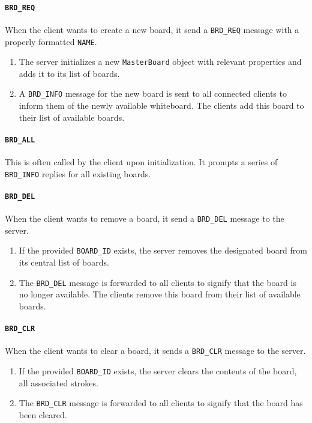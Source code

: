 \paragraph{\texttt{BRD\_REQ}} When the client wants to create a new board, it send a \texttt{BRD\_REQ} message with a properly formatted \texttt{NAME}.
\begin{enumerate}
\item The server initializes a new \texttt{MasterBoard} object with relevant properties and adds it to its list of boards.
\item A \texttt{BRD\_INFO} message for the new board is sent to all connected clients to inform them of the newly available whiteboard. The clients add this board to their list of available boards.
\end{enumerate}

\paragraph{\texttt{BRD\_ALL}} This is often called by the client upon initialization. It prompts a series of \texttt{BRD\_INFO} replies for all existing boards.

\paragraph{\texttt{BRD\_DEL}} When the client wants to remove a board, it send a \texttt{BRD\_DEL} message to the server.
\begin{enumerate}
\item If the provided \texttt{BOARD\_ID} exists, the server removes the designated board from its central list of boards.
\item The \texttt{BRD\_DEL} message is forwarded to all clients to signify that the board is no longer available. The clients remove this board from their list of available boards.
\end{enumerate}

\paragraph{\texttt{BRD\_CLR}} When the client wants to clear a board, it sends a \texttt{BRD\_CLR} message to the server.
\begin{enumerate}
\item If the provided \texttt{BOARD\_ID} exists, the server clears the contents of the board, all associated strokes.
\item The \texttt{BRD\_CLR} message is forwarded to all clients to signify that the board has been cleared.
\end{enumerate}

